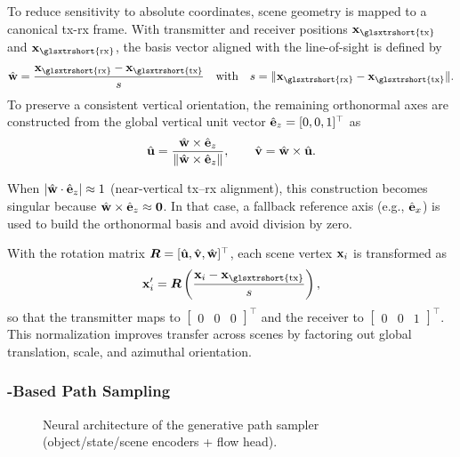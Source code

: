 To reduce sensitivity to absolute coordinates, scene geometry is mapped to a canonical \gls{tx}-\gls{rx} frame. With transmitter and receiver positions $\bsup{x}_{\text{\glsxtrshort{tx}}}$ and $\bsup{x}_{\text{\glsxtrshort{rx}}}$, the basis vector aligned with the \gls{line-of-sight} is defined by
\begin{equation}
  \uvec{w} = \frac{\bsup{x}_{\text{\glsxtrshort{rx}}} - \bsup{x}_{\text{\glsxtrshort{tx}}}}{s}
  \quad \text{with} \quad
  s = \|\bsup{x}_{\text{\glsxtrshort{rx}}} - \bsup{x}_{\text{\glsxtrshort{tx}}}\|.
\end{equation}
To preserve a consistent vertical orientation, the remaining orthonormal axes are constructed from the global vertical unit vector $\hat{\mathbf{e}}_z=[0,0,1]^\top$ as
\begin{equation}
  \hat{\mathbf{u}}=\frac{\hat{\mathbf{w}}\times\hat{\mathbf{e}}_z}{\|\hat{\mathbf{w}}\times\hat{\mathbf{e}}_z\|},
  \qquad
  \hat{\mathbf{v}}=\hat{\mathbf{w}}\times\hat{\mathbf{u}}.
\end{equation}

When $|\hat{\mathbf{w}}\cdot\hat{\mathbf{e}}_z|\approx 1$ (near-vertical \gls{tx}--\gls{rx} alignment), this construction becomes singular because $\hat{\mathbf{w}}\times\hat{\mathbf{e}}_z\approx\mathbf{0}$. In that case, a fallback reference axis (e.g., $\hat{\mathbf{e}}_x$) is used to build the orthonormal basis and avoid division by zero.

With the rotation matrix $\boldsymbol{R}=[\hat{\mathbf{u}},\hat{\mathbf{v}},\hat{\mathbf{w}}]^\top$, each scene vertex $\mathbf{x}_i$ is transformed as
\begin{equation}
  \bsup{x}'_i = \bsit{R}\left(\frac{\bsup{x}_i-\bsup{x}_{\text{\glsxtrshort{tx}}}}{s}\right),
\end{equation}
so that the transmitter maps to $
\begin{bmatrix}0 & 0 & 0
\end{bmatrix}^\top$ and the receiver to $
\begin{bmatrix}0 & 0 & 1
\end{bmatrix}^\top$. This normalization improves transfer across scenes by factoring out global translation, scale, and azimuthal orientation.

\subsubsection{-Based Path Sampling}

\begin{figure}
  \centering
  \caption{Neural architecture of the generative path sampler (object/state/scene encoders + flow head).}
\end{figure}

